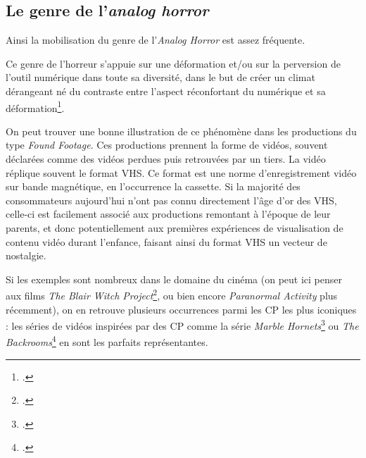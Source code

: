 \documentclass[12pt,a4paper,oneside,titlepage]{book} %
\begin{document}
\subsection{Le genre de l'\emph{analog horror}}

Ainsi la mobilisation du genre de l’\emph{Analog Horror} est assez fréquente. 

Ce genre de l’horreur s’appuie sur une déformation et/ou sur la perversion de l’outil numérique dans toute sa diversité, dans le but de créer un climat dérangeant né du contraste entre l’aspect réconfortant du numérique et sa déformation\footcite{balanzategui_creepypasta_2019}. 
\par
On peut trouver une bonne illustration de ce phénomène dans les productions du type \textit{Found Footage}. Ces productions prennent la forme de vidéos, souvent déclarées comme des vidéos perdues puis retrouvées par un tiers. La vidéo réplique souvent le format VHS. Ce format est une norme d'enregistrement vidéo sur bande magnétique, en l'occurrence la cassette. Si la majorité des consommateurs aujourd'hui n'ont pas connu directement l'âge d'or des VHS, celle-ci est facilement associé aux productions remontant à l'époque de leur parents, et donc potentiellement aux premières expériences de visualisation de contenu vidéo durant l'enfance, faisant ainsi du format VHS un vecteur de nostalgie.

Si les exemples sont nombreux dans le domaine du cinéma (on peut ici penser aux films \emph{The Blair Witch Project}\footcite{myrick_blair_1999}, ou bien encore \emph{Paranormal Activity} plus récemment), on en retrouve plusieurs occurrences parmi les CP les plus iconiques : les séries de vidéos inspirées par des CP comme la série \emph{Marble Hornets}\footcite{marble_hornets_introduction_2009} ou\emph{ The Backrooms}\footcite{kane_pixels_backrooms_2022} en sont les parfaits représentantes.
\end{document}

